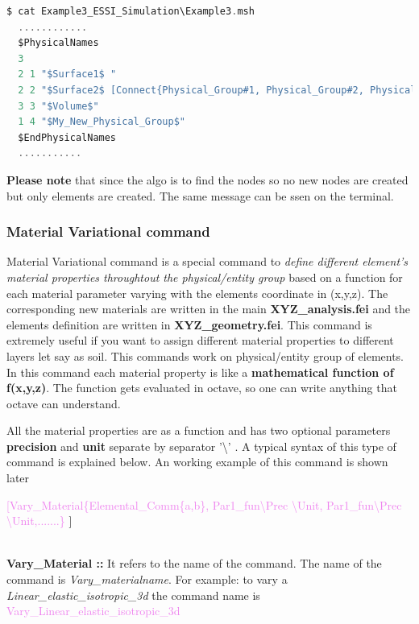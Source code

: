 \documentclass[11pt]{article}
\begin{document}
\begin{lstlisting}[language=C]
$ cat Example3_ESSI_Simulation\Example3.msh
  ............
  $PhysicalNames
  3
  2 1 "$Surface1$ "
  2 2 "$Surface2$ [Connect{Physical_Group#1, Physical_Group#2, Physical_Group#3,0\0\1, 1, 1, find, 0.005, My_New_Physical_Group}]"
  3 3 "$Volume$"
  1 4 "$My_New_Physical_Group$"
  $EndPhysicalNames
  ...........
\end{lstlisting}

\noindent \textbf{Please note} that since the algo is to find the nodes so no new nodes
  are created but only elements are created. The same message can be ssen on
  the terminal.

\subsubsection{Material Variational command}

Material Variational command is a special command to \textit{define
different element's material properties throughtout the physical/entity group}
based on a function for each material parameter varying with the elements
coordinate in (x,y,z). The corresponding new materials are written in the main
\textbf{XYZ_analysis.fei} and the elements definition are written in
\textbf{XYZ_geometry.fei}. This command is extremely useful if you want to
assign different material properties to different layers let say as soil. This
commands work on physical/entity group of elements. In this command each
material property is like a \textbf{mathematical function of f(x,y,z)}. The
function gets evaluated in octave, so one can write anything that octave can
understand.

All the material properties are as a function and has two optional parameters
\textbf{precision} and \textbf{unit} separate by separator '\textbackslash' . A
typical syntax of this type of command is explained below. An working example
of this command is shown later \\


\centerline{\textcolor{violet}{[Vary\_Material\{Elemental\_Comm\{a,b\},
Par1_fun\textbackslash Prec \textbackslash Unit, Par1_fun\textbackslash Prec
\textbackslash Unit,.......\} }]}


\noindent \\ \textbf{Vary\_Material  ::} It refers to the name of the command. The
name of the   command   is   \textit{Vary_materialname}.   For  example:  to 
vary  a \textit{Linear\_elastic\_isotropic\_3d}      the      command     name  
is \textcolor{violet} { Vary\_Linear\_elastic\_isotropic\_3d } \\ 
\end{document}
